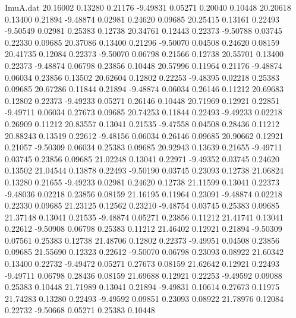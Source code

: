 \begin{filecontents}{ImuA.dat}
  20.16002    0.13280    0.21176   -9.49831    0.05271    0.20040    0.10448
  20.20618    0.13400    0.21894   -9.48874    0.02981    0.24620    0.09685
  20.25415    0.13161    0.22493   -9.50549    0.02981    0.25383    0.12738
  20.34761    0.12443    0.22373   -9.50788    0.03745    0.22330    0.09685
  20.37086    0.13400    0.21296   -9.50070    0.04508    0.24620    0.08159
  20.41735    0.12084    0.22373   -9.50070    0.06798    0.21566    0.12738
  20.55701    0.13400    0.22373   -9.48874    0.06798    0.23856    0.10448
  20.57996    0.11964    0.21176   -9.48874    0.06034    0.23856    0.13502
  20.62604    0.12802    0.22253   -9.48395    0.02218    0.25383    0.09685
  20.67286    0.11844    0.21894   -9.48874    0.06034    0.26146    0.11212
  20.69683    0.12802    0.22373   -9.49233    0.05271    0.26146    0.10448
  20.71969    0.12921    0.22851   -9.49711    0.06034    0.27673    0.09685
  20.74253    0.11844    0.22493   -9.49233    0.02218    0.26909    0.11212
  20.83557    0.13041    0.21535   -9.47558    0.04508    0.28436    0.11212
  20.88243    0.13519    0.22612   -9.48156    0.06034    0.26146    0.09685
  20.90662    0.12921    0.21057   -9.50309    0.06034    0.25383    0.09685
  20.92943    0.13639    0.21655   -9.49711    0.03745    0.23856    0.09685
  21.02248    0.13041    0.22971   -9.49352    0.03745    0.24620    0.13502
  21.04544    0.13878    0.22493   -9.50190    0.03745    0.23093    0.12738
  21.06824    0.13280    0.21655   -9.49233    0.02981    0.24620    0.12738
  21.11599    0.13041    0.22373   -9.48036    0.02218    0.23856    0.08159
  21.16195    0.11964    0.23091   -9.48874    0.02218    0.22330    0.09685
  21.23125    0.12562    0.23210   -9.48754    0.03745    0.25383    0.09685
  21.37148    0.13041    0.21535   -9.48874    0.05271    0.23856    0.11212
  21.41741    0.13041    0.22612   -9.50908    0.06798    0.25383    0.11212
  21.46402    0.12921    0.21894   -9.50309    0.07561    0.25383    0.12738
  21.48706    0.12802    0.22373   -9.49951    0.04508    0.23856    0.09685
  21.55690    0.12323    0.22612   -9.50070    0.06798    0.23093    0.08922
  21.60342    0.13400    0.22732   -9.49472    0.05271    0.27673    0.08159
  21.62642    0.12921    0.22493   -9.49711    0.06798    0.28436    0.08159
  21.69688    0.12921    0.22253   -9.49592    0.09088    0.25383    0.10448
  21.71989    0.13041    0.21894   -9.49831    0.10614    0.27673    0.11975
  21.74283    0.13280    0.22493   -9.49592    0.09851    0.23093    0.08922
  21.78976    0.12084    0.22732   -9.50668    0.05271    0.25383    0.10448

\end{filecontents}
